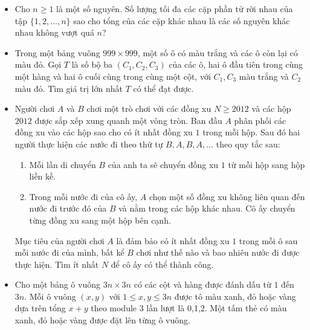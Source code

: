 \documentclass[11pt]{scrartcl}
\begin{document}
\begin{itemize}[label=, leftmargin=0em, itemsep=-0em]
    \item \begin{btvn}
        Cho $n \geq 1$ là một số nguyên. Số lượng tối đa các cặp phần tử rời nhau của tập $\{ 1,2,\ldots , n \}$ sao cho tổng của các cặp khác nhau là các số nguyên khác nhau không vượt quá $n$?
    \end{btvn}

    \item \begin{btvn}
    Trong một bảng vuông $999 \times 999$, một số ô có màu trắng và các ô còn lại có màu đỏ. Gọi $T$ là số bộ ba $(C_1,C_2,C_3)$ của các ô, hai ô đầu tiên trong cùng một hàng và hai ô cuối cùng trong cùng một cột, với $C_1,C_3$ màu trắng và $C_2$ màu đỏ. Tìm giá trị lớn nhất $T$ có thể đạt được.
    \end{btvn}

    \item \begin{btvn}
    Người chơi $A$ và $B$ chơi một trò chơi với các đồng xu $N \geq 2012$ và các hộp $2012$ được sắp xếp xung quanh một vòng tròn. Ban đầu $A$ phân phối các đồng xu vào các hộp sao cho có ít nhất đồng xu $1$ trong mỗi hộp. Sau đó hai người thực hiện các nước đi theo thứ tự $B,A,B,A,\ldots $ theo quy tắc sau:
    \begin{enumerate}
        \item Mỗi lần di chuyển $B$ của anh ta sẽ chuyển đồng xu $1$ từ mỗi hộp sang hộp liền kề.
        \item Trong mỗi nước đi của cô ấy, $A$ chọn một số đồng xu không liên quan đến nước đi trước đó của $B$ và nằm trong các hộp khác nhau. Cô ấy chuyển từng đồng xu sang một hộp bên cạnh.
    \end{enumerate}
    Mục tiêu của người chơi $A$ là đảm bảo có ít nhất đồng xu $1$ trong mỗi ô sau mỗi nước đi của mình, bất kể $B$ chơi như thế nào và bao nhiêu nước đi được thực hiện. Tìm ít nhất $N$ để cô ấy có thể thành công.
    \end{btvn}
    
    \item \begin{btvn}
        Cho một bảng ô vuông $3n \times 3n$ có các cột và hàng được đánh dấu từ $1$ đến $3n$. Mỗi ô vuông $(x,y)$ với $1 \leq x,y \leq 3n$ được tô màu xanh, đỏ hoặc vàng dựa trên tổng $x + y$ theo module 3 lần lượt là 0,1,2. Một tấm thẻ có màu xanh, đỏ hoặc vàng được đặt lên từng ô vuông.
        

\end{btvn}
\end{itemize}
\end{document}
